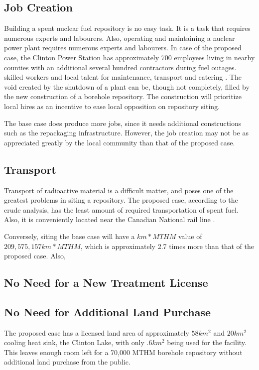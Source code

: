\documentclass{anstrans}
\begin{document}
\subsection{Job Creation}

Building a spent nuclear fuel repository is no easy task. It is a task that requires
numerous experts and labourers. Also, operating and maintaining a nuclear power plant
requires numerous experts and labourers. In case of the proposed case, the Clinton
 Power Station has approximately 700 employees living in nearby counties with an
additional several hundred contractors during fuel outages.\cite{Exelon}
skilled workers and local talent for maintenance, transport and catering \cite{IAEA_2008}. The void created by the shutdown of a plant can be, though not
completely, filled by the new construction of a borehole repository. The construction
will prioritize local hires as an incentive to ease local opposition on repository siting. 

The base case does produce more jobs, since it needs additional constructions such
as the repackaging infrastructure. However, the job creation may not be as
appreciated greatly by the local community than that of the proposed case.


\subsection{Transport}
Transport of radioactive material is a difficult matter, and poses one of the greatest
problems in siting a repository. The proposed case, according to the crude analysis,
has the least amount of required transportation of spent fuel. Also, it is
conveniently located near the Canadian National rail line \cite{waleed_regional_2015}. 

Conversely, siting the base case will have a $km*MTHM$ value of $209,575,157 km*MTHM$, 
which is approximately 2.7 times more than that of the proposed case. Also, %

\subsection{No Need for a New Treatment License}

\subsection{No Need for Additional Land Purchase}
The proposed case has a licensed land area of approximately $58km^2$ and $20km^2$
 cooling heat sink, the Clinton Lake, with only $.6km^2$ being used for the facility.
  \cite{NRC_Clinton} This leaves enough room left for a 70,000 \gls{MTHM} borehole
  repository without additional land purchase from the public. 
\end{document}
